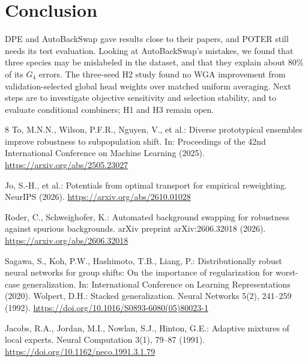 \documentclass[runningheads]{llncs}
\begin{document}
\section{Conclusion}
DPE and AutoBackSwap gave results close to their papers, and POTER still needs its test evaluation. Looking at AutoBackSwap's mistakes, we found that three species may be mislabeled in the dataset, and that they explain about 80\% of its $G_4$ errors. The three-seed H2 study found no WGA improvement from validation-selected global head weights over matched uniform averaging. Next steps are to investigate objective sensitivity and selection stability, and to evaluate conditional combiners; H1 and H3 remain open.
%
%
\begin{thebibliography}{8}
\sloppy
{}
To, M.N.N., Wilson, P.F.R., Nguyen, V., et al.: Diverse prototypical ensembles improve robustness to subpopulation shift. In: Proceedings of the 42nd International Conference on Machine Learning (2025). \url{https://arxiv.org/abs/2505.23027}

Jo, S.-H., et al.: Potentials from optimal transport for empirical reweighting. NeurIPS (2026). \url{https://arxiv.org/abs/2610.01028}

Roder, C., Schweighofer, K.: Automated background swapping for robustness against spurious backgrounds. arXiv preprint arXiv:2606.32018 (2026). \url{https://arxiv.org/abs/2606.32018}

Sagawa, S., Koh, P.W., Hashimoto, T.B., Liang, P.: Distributionally robust neural networks for group shifts: On the importance of regularization for worst-case generalization. In: International Conference on Learning Representations (2020).
Wolpert, D.H.: Stacked generalization. Neural Networks 5(2), 241--259 (1992). \url{https://doi.org/10.1016/S0893-6080(05)80023-1}

Jacobs, R.A., Jordan, M.I., Nowlan, S.J., Hinton, G.E.: Adaptive mixtures of local experts. Neural Computation 3(1), 79--87 (1991). \url{https://doi.org/10.1162/neco.1991.3.1.79}
\end{thebibliography}
\end{document}
